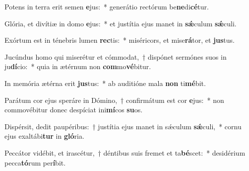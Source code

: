 \item Potens in terra erit semen \textbf{e}jus:~* generátio rectórum be\textbf{ne}di\textbf{cé}tur.
\item Glória, et divítiæ in domo \textbf{e}jus:~* et justítia ejus manet in \textbf{sǽ}culum \textbf{sǽ}culi.
\item Exórtum est in ténebris lumen \textbf{rec}tis:~* miséricors, et mise\textbf{rá}tor, et \textbf{jus}tus.
\item Jucúndus homo qui miserétur et cómmodat,~† dispónet sermónes suos in ju\textbf{dí}cio:~* quia in ætérnum non \textbf{com}mo\textbf{vé}bitur.
\item In memória ætérna erit \textbf{jus}tus:~* ab auditióne mala \textbf{non} ti\textbf{mé}bit.
\item Parátum cor ejus speráre in Dómino,~† confirmátum est cor \textbf{e}jus:~* non commovébitur donec despíciat ini\textbf{mí}cos \textbf{su}os.
\item Dispérsit, dedit paupéribus:~† justítia ejus manet in sǽculum \textbf{sǽ}culi,~* cornu ejus exaltábi\textbf{tur} in \textbf{gló}ria.
\item Peccátor vidébit, et irascétur,~† déntibus suis fremet et ta\textbf{bé}scet:~* desidérium pecca\textbf{tó}rum per\textbf{í}bit.
